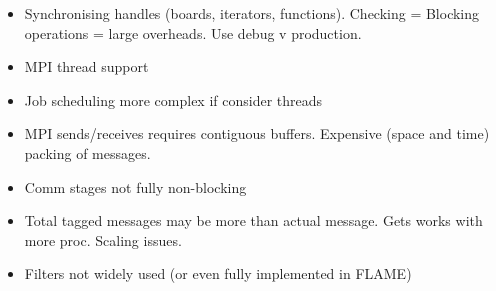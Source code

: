 \begin{itemize}
\item Synchronising handles (boards, iterators, functions). Checking = Blocking operations = large overheads. Use debug v production.
\item MPI thread support
\item Job scheduling more complex if consider threads
\item MPI sends/receives requires contiguous buffers. Expensive (space and time) packing of messages.
\item Comm stages not fully non-blocking
\item Total tagged messages may be more than actual message. Gets works with more proc. Scaling issues.
\item Filters not widely used (or even fully implemented in FLAME)
\end{itemize} 

